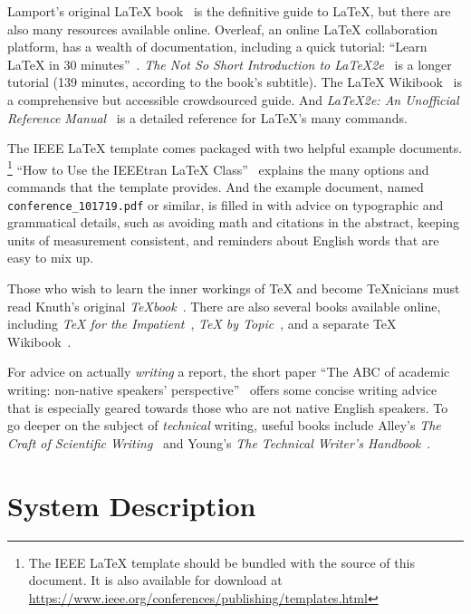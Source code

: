 \documentclass[
	conference,	%
]{IEEEtran}
\newcommand{\booktitle}[1]{\textit{#1}}
\newcommand{\papertitle}[1]{\enquote{#1}}
\newcommand{\TeXnicians}{\TeX\-nicians}
\begin{document}
Lamport's original {\LaTeX} book~\cite{Lamport1994LatexBook}
is the definitive guide to {\LaTeX},
but there are also many resources available online.
%
Overleaf, an online {\LaTeX} collaboration platform,
has a wealth of documentation, including a quick tutorial:
\papertitle{Learn {\LaTeX} in 30 minutes}~\cite{OverleafTutorial30Minutes}.
%
\booktitle{The Not So Short Introduction
	to {\LaTeX2e}}~\cite{LatexTutorialNotSoShort}
is a longer tutorial (139 minutes, according to the book's subtitle).
%
The {\LaTeX} Wikibook~\cite{LatexWikibook}
is a comprehensive but accessible crowdsourced guide.
%
And
\booktitle{{\LaTeX2e}: An Unofficial Reference Manual}~\cite{latex2eReference}
is a detailed reference for {\LaTeX}'s many commands.

The IEEE {\LaTeX} template
comes packaged with two helpful example documents.\footnotemark
\footnote{The IEEE {\LaTeX} template should be bundled
	with the source of this document.
	It is also available for download at
	\url{https://www.ieee.org/conferences/publishing/templates.html}}
%
\papertitle{How to Use the IEEEtran {\LaTeX}
	Class}~\cite{Shell2015HowToIEEtran}
explains the many options and commands that the template provides.
%
And the example document,
named \lstinline{conference_101719.pdf} or similar,
is filled in with advice on typographic and grammatical details,
such as avoiding math and citations in the abstract,
keeping units of measurement consistent,
and reminders about English words that are easy to mix up.

Those who wish to learn the inner workings of {\TeX}
and become {\TeXnicians}
must read Knuth's original \booktitle{\TeX book}~\cite{Knuth1986Texbook}.
%
There are also several books available online,
including
\booktitle{{\TeX} for the Impatient}~\cite{TexForTheImpatient},
\booktitle{{\TeX} by Topic}~\cite{Eijkhout1992TexByTopic},
and a separate {\TeX} Wikibook~\cite{TexWikibook}.

For advice on actually \emph{writing} a report,
the short paper
\papertitle{The ABC of academic writing: non-native speakers'
	perspective}~\cite{Nakagawa2024ABC}
offers some concise writing advice that is especially geared towards
those who are not native English speakers.
To go deeper on the subject of \emph{technical} writing,
useful books include
Alley's \booktitle{The Craft of Scientific Writing}~\cite{AlleyMichael2018TCoS}
and
Young's \booktitle{The Technical Writer's
	Handbook}~\cite{Young2002TechnicalWritersHandbook}.


\section{System Description}
\label{description}
\end{document}
